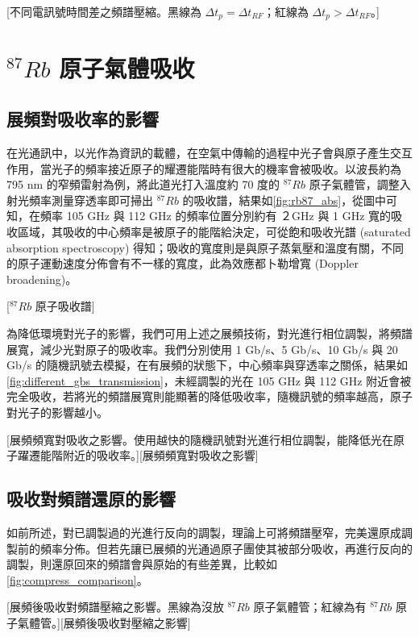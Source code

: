 \documentclass[class=NCU_thesis, crop=false]{standalone}
\begin{document}
[不同電訊號時間差之頻譜壓縮。黑線為 $\Delta t_{p}=\Delta t_{RF}$；紅線為 $\Delta t_{p}>\Delta t_{RF}$。]

\section{$^{87}Rb$ 原子氣體吸收}

\subsection{展頻對吸收率的影響}
\label{section:simulation_absorption}
在光通訊中，以光作為資訊的載體，在空氣中傳輸的過程中光子會與原子產生交互作用，當光子的頻率接近原子的耀遷能階時有很大的機率會被吸收。以波長約為 795  nm 的窄頻雷射為例，將此道光打入溫度約 70 度的 $^{87}Rb$ 原子氣體管，調整入射光頻率測量穿透率即可掃出 $^{87}Rb$ 的吸收譜，結果如\cref{fig:rb87_abs}，從圖中可知，在頻率 105 GHz 與 112 GHz 的頻率位置分別約有 ２GHz 與 1 GHz 寬的吸收區域，其吸收的中心頻率是被原子的能階給決定，可從飽和吸收光譜 (saturated absorption spectroscopy) 得知；吸收的寬度則是與原子蒸氣壓和溫度有關，不同的原子運動速度分佈會有不一樣的寬度，此為效應都卜勒增寬 (Doppler broadening)。

[$^{87}Rb$ 原子吸收譜]

為降低環境對光子的影響，我們可用上述之展頻技術，對光進行相位調製，將頻譜展寬，減少光對原子的吸收率。我們分別使用 1 Gb/s、5 Gb/s、10 Gb/s 與 20 Gb/s 的隨機訊號去模擬，在有展頻的狀態下，中心頻率與穿透率之關係，結果如\cref{fig:different_gbs_transmission}，未經調製的光在 105 GHz 與 112 GHz 附近會被完全吸收，若將光的頻譜展寬則能顯著的降低吸收率，隨機訊號的頻率越高，原子對光子的影響越小。

[展頻頻寬對吸收之影響。使用越快的隨機訊號對光進行相位調製，能降低光在原子躍遷能階附近的吸收率。][展頻頻寬對吸收之影響]

\subsection{吸收對頻譜還原的影響}
如前所述，對已調製過的光進行反向的調製，理論上可將頻譜壓窄，完美還原成調製前的頻率分佈。但若先讓已展頻的光通過原子團使其被部分吸收，再進行反向的調製，則還原回來的頻譜會與原始的有些差異，比較如\cref{fig:compress_comparison}。

[展頻後吸收對頻譜壓縮之影響。黑線為沒放 $^{87}Rb$ 原子氣體管；紅線為有 $^{87}Rb$ 原子氣體管。][展頻後吸收對壓縮之影響]
\end{document}
